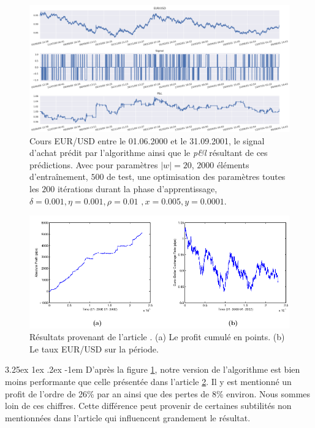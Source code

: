 \documentclass[a4paper, 11pt]{article}
\makeatletter
\renewcommand\paragraph{\@startsection{paragraph}{5}{\z@}%
  {3.25ex \@plus1ex \@minus.2ex}%
  {-1em}%
  {\normalfont\normalsize\bfseries}}
\makeatother
\begin{document}
 \begin{figure}
 	\centering
 	\includegraphics[scale=0.5]{res/eursud_2000-2001}
 	\caption[Blup]{Cours EUR/USD entre le 01.06.2000 et le 31.09.2001, le signal d'achat prédit par l'algorithme ainsi que le \textit{p\&l} résultant de ces prédictions. Avec pour paramètres $|w| = 20$, $2000$ éléments d'entraînement, $500$ de test, une optimisation des
 		paramètres toutes les $200$ itérations durant la phase d'apprentissage, $\delta = 0.001, \eta=0.001,\rho=0.01$
 		\footnotemark$, x = 0.005, y=0.0001$.}
 	\label{eurusd 2000 2001 1M}
 \end{figure}

 
 \begin{figure}
	\centering
	\includegraphics[scale=0.5]{images/res_from_article}
	\caption[Blup]{Résultats provenant de l'article \cite{fx_trading}. (a) Le profit cumulé en points. (b) Le taux EUR/USD sur la période. }
	\label{eurusd 2000 2001 1M article}
\end{figure}

\paragraph{}
 D'après la figure \ref{eurusd 2000 2001 1M}, notre version de l'algorithme est bien moins performante que celle présentée dans l'article \ref{eurusd 2000 2001 1M article}. Il y est mentionné un profit de l'ordre de 26\% par an ainsi que des pertes de 8\% environ. Nous sommes loin de ces chiffres. Cette différence peut provenir de certaines subtilités non mentionnées dans l'article qui influencent grandement le résultat.
 
\end{document}
